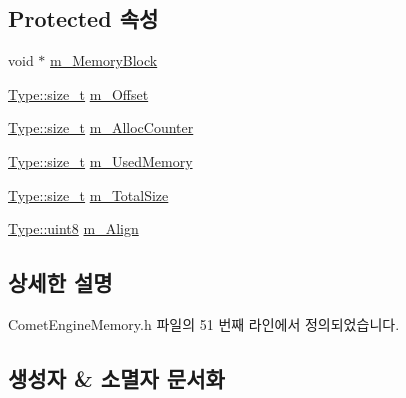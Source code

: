 \subsection*{Protected 속성}
\begin{DoxyCompactItemize}
\item 
void $\ast$ \hyperlink{class_comet_engine_1_1_core_1_1_memory_1_1_base_allocator_a24b4bdf45e7f4b6109b6d1cc455c6f26}{m\+\_\+\+Memory\+Block}
\item 
\hyperlink{namespace_comet_engine_1_1_type_a7c94ea6f8948649f8d181ae55911eeaf}{Type\+::size\+\_\+t} \hyperlink{class_comet_engine_1_1_core_1_1_memory_1_1_base_allocator_a71e2142fb28745ce9bc64de3a0ea1956}{m\+\_\+\+Offset}
\item 
\hyperlink{namespace_comet_engine_1_1_type_a7c94ea6f8948649f8d181ae55911eeaf}{Type\+::size\+\_\+t} \hyperlink{class_comet_engine_1_1_core_1_1_memory_1_1_base_allocator_abed7f06b465ee178701fe2cfc1aff9a6}{m\+\_\+\+Alloc\+Counter}
\item 
\hyperlink{namespace_comet_engine_1_1_type_a7c94ea6f8948649f8d181ae55911eeaf}{Type\+::size\+\_\+t} \hyperlink{class_comet_engine_1_1_core_1_1_memory_1_1_base_allocator_a1420047b91508f9ab33c448e8371511c}{m\+\_\+\+Used\+Memory}
\item 
\hyperlink{namespace_comet_engine_1_1_type_a7c94ea6f8948649f8d181ae55911eeaf}{Type\+::size\+\_\+t} \hyperlink{class_comet_engine_1_1_core_1_1_memory_1_1_base_allocator_abba9914681f05b98a55770daaf7d94be}{m\+\_\+\+Total\+Size}
\item 
\hyperlink{namespace_comet_engine_1_1_type_a1b09856a6463f2bcc4bd8ff0e4e3ee0f}{Type\+::uint8} \hyperlink{class_comet_engine_1_1_core_1_1_memory_1_1_base_allocator_a01f973630e3c1ac98b9defda193793b8}{m\+\_\+\+Align}
\end{DoxyCompactItemize}


\subsection{상세한 설명}


Comet\+Engine\+Memory.\+h 파일의 51 번째 라인에서 정의되었습니다.



\subsection{생성자 \& 소멸자 문서화}
\mbox{\label{class_comet_engine_1_1_core_1_1_memory_1_1_base_allocator_a389c24863a5abee333f325634c18bea3}} 
